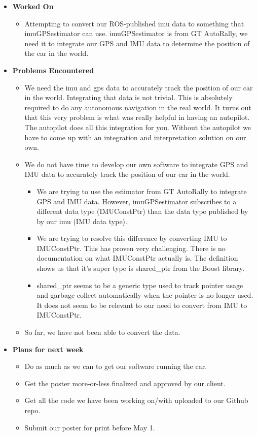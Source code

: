 \documentclass[compsoc,draftclsnofoot,onecolumn,10pt]{IEEEtran}
\begin{document}
\begin{itemize}
    \item {\textbf{Worked On}}
    \begin{itemize}
        \item Attempting to convert our ROS-published imu data to something that imuGPSestimator can use. imuGPSestimator is from GT AutoRally, we need it to integrate our GPS and IMU data to determine the position of the car in the world.
    \end{itemize}

    \item {\textbf{Problems Encountered}}
    \begin{itemize}
        \item We need the imu and gps data to accurately track the position of our car in the world. Integrating that data is not trivial. This is absolutely required to do any autonomous navigation in the real world. It turns out that this very problem is what was really helpful in having an autopilot. The autopilot does all this integration for you. Without the autopilot we have to come up with an integration and interpretation solution on our own.
\item We do not have time to develop our own software to integrate GPS and IMU data to accurately track the position of our car in the world.
    \begin{itemize}
        \item We are trying to use the estimator from GT AutoRally to integrate GPS and IMU data. However, imuGPSestimator subscribes to a different data type (IMUConstPtr) than the data type published by by our imu (IMU data type).
        \item We are trying to resolve this difference by converting IMU to IMUConstPtr. This has proven very challenging. There is no documentation on what IMUConstPtr actually is. The definition shows us that it's super type is shared\_ptr from the Boost library.
        \item shared\_ptr seems to be a generic type used to track pointer usage and garbage collect automatically when the pointer is no longer used. It does not seem to be relevant to our need to convert from IMU to IMUConstPtr.
    \end{itemize}

    \item So far, we have not been able to convert the data.
    \end{itemize}

    \item{\textbf{Plans for next week}}
    \begin{itemize}
        \item Do as much as we can to get our software running the car.
        \item Get the poster more-or-less finalized and approved by our client.
        \item Get all the code we have been working on/with uploaded to our Github repo.
        \item Submit our poster for print before May 1.
    \end{itemize}
\end{itemize}
\end{document}
